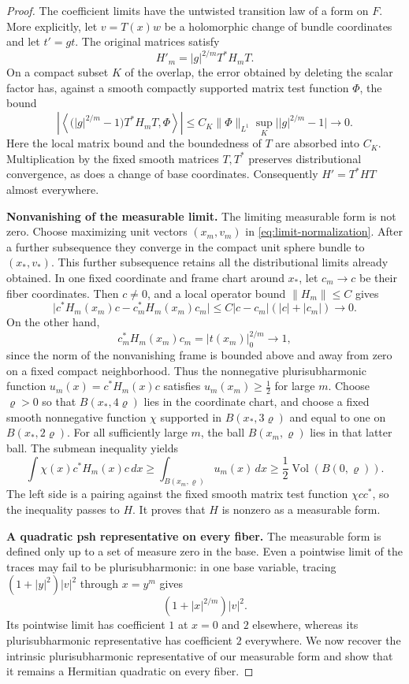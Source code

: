 \begin{proof}
The coefficient limits have the untwisted transition law of a form
on $F$.  More explicitly, let $v=T(x)w$ be a holomorphic change of
bundle coordinates and let $t'=gt$.  The original matrices satisfy
\[
H'_m=|g|^{2/m}T^*H_mT.
\]
On a compact subset $K$ of the overlap, the error obtained by deleting
the scalar factor has, against a smooth compactly supported matrix
test function $\Phi$, the bound
\[
\left|\left\langle
\bigl(|g|^{2/m}-1\bigr)T^*H_mT,\Phi
\right\rangle\right|
\le C_K\|\Phi\|_{L^1}
\sup_K\bigl||g|^{2/m}-1\bigr|\longrightarrow0.
\]
Here the local matrix bound and the boundedness of $T$ are absorbed
into $C_K$.  Multiplication by the fixed smooth matrices $T,T^*$
preserves distributional convergence, as does a change of base
coordinates.  Consequently $H'=T^*HT$ almost everywhere.

\smallskip\noindent\textbf{Nonvanishing of the measurable limit.}
The limiting measurable form is not zero.  Choose maximizing unit
vectors $(x_m,v_m)$ in \eqref{eq:limit-normalization}.  After a further
subsequence they converge in the compact unit sphere bundle to
$(x_*,v_*)$.  This further subsequence retains all the distributional
limits already obtained.  In one fixed coordinate and frame chart
around $x_*$, let $c_m\to c$ be their fiber coordinates.  Then $c\ne0$,
and a local operator bound $\|H_m\|\le C$ gives
\[
\bigl|c^*H_m(x_m)c-c_m^*H_m(x_m)c_m\bigr|
\le C|c-c_m|(|c|+|c_m|)\longrightarrow0.
\]
On the other hand,
\[
c_m^*H_m(x_m)c_m=|t(x_m)|_0^{2/m}\longrightarrow1,
\]
since the norm of the nonvanishing frame is bounded above and away
from zero on a fixed compact neighborhood.  Thus the nonnegative
plurisubharmonic function
$u_m(x)=c^*H_m(x)c$ satisfies $u_m(x_m)\ge\tfrac12$ for large $m$.
Choose $\varrho>0$ so that $B(x_*,4\varrho)$ lies in the coordinate
chart, and choose a fixed smooth nonnegative function $\chi$ supported
in $B(x_*,3\varrho)$ and equal to one on $B(x_*,2\varrho)$.
For all sufficiently large $m$, the ball $B(x_m,\varrho)$ lies in
that latter ball.  The submean inequality yields
\begin{equation}\label{eq:limit-noncollapse}
\int\chi(x)c^*H_m(x)c\,dx
\ge\int_{B(x_m,\varrho)}u_m(x)\,dx
\ge\frac12\operatorname{Vol}(B(0,\varrho)).
\end{equation}
The left side is a pairing against the fixed smooth matrix test
function $\chi cc^*$, so the inequality passes to $H$.  It proves
that $H$ is nonzero as a measurable form.

\smallskip\noindent\textbf{A quadratic psh representative on every fiber.}
The measurable form is defined only up to a set of measure zero in
the base. Even a
pointwise limit of the traces may fail to be plurisubharmonic: in one
base variable, tracing $(1+|y|^2)|v|^2$ through $x=y^m$ gives
\[
 (1+|x|^{2/m})|v|^2.
\]
Its pointwise limit has coefficient $1$ at $x=0$ and $2$ elsewhere,
whereas its plurisubharmonic representative has coefficient $2$
everywhere. We now recover the intrinsic plurisubharmonic
representative of our measurable form and show that it remains a
Hermitian quadratic on every fiber.


\end{proof}

